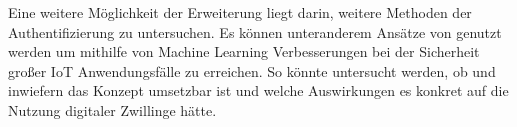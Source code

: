 \documentclass[
	12pt,
	BCOR=5mm,
	DIV=12,
	headinclude=on,
	footinclude=off,
	parskip=half,
	bibliography=totoc,
	listof=entryprefix,
	toc=listof,
	numbers=noenddot,
	plainfootsepline
]{scrreprt}
\begin{document}
Eine weitere Möglichkeit der Erweiterung liegt darin, weitere Methoden der Authentifizierung zu untersuchen. Es können unteranderem Ansätze von \citeauthor{fang2020fast} genutzt werden um mithilfe von Machine Learning Verbesserungen bei der Sicherheit großer IoT Anwendungsfälle zu erreichen. \autocite{fang2020fast} So könnte untersucht werden, ob und inwiefern das Konzept umsetzbar ist und welche Auswirkungen es konkret auf die Nutzung digitaler Zwillinge hätte. 

\clearpage
\ihead{}
\printbibliography[title=Literaturverzeichnis]
\cleardoublepage

\end{document}
